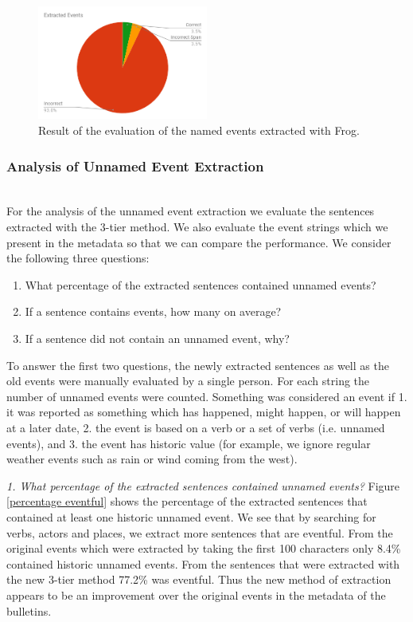 \documentclass[a4paper, 10pt, conference]{ieeeconf}      %
\begin{document}
\begin{figure}
  \centering
  \includegraphics[width= 0.5\textwidth]{FrogEvents2}
  \caption{Result of the evaluation of the named events extracted with Frog.}
  \label{Frog events}
\end{figure}

\subsubsection{Analysis of Unnamed Event Extraction}\label{Analysis2}~\\
For the analysis of the unnamed event extraction we evaluate the sentences extracted with the 3-tier method. We also evaluate the event strings which we present in the metadata so that we can compare the performance. We consider the following three questions:
\begin{enumerate}
\item What percentage of the extracted sentences contained unnamed events?
\item If a sentence contains events, how many on average?
\item If a sentence did not contain an unnamed event, why?
\end{enumerate}

To answer the first two questions, the newly extracted sentences as well as the old events were manually evaluated by a single person. For each string the number of unnamed events were counted. Something was considered an event if 1. it was reported as something which has happened, might happen, or will happen at a later date, 2. the event is based on a verb or a set of verbs (i.e. unnamed events), and 3. the event has historic value (for example, we ignore regular weather events such as rain or wind coming from the west).

\textit{1. What percentage of the extracted sentences contained unnamed events?} Figure \ref{percentage eventful} shows the percentage of the extracted sentences that contained at least one historic unnamed event. We see that by searching for verbs, actors and places, we extract more sentences that are eventful. From the original events which were extracted by taking the first 100 characters only 8.4\% contained historic unnamed events. From the sentences that were extracted with the new 3-tier method 77.2\% was eventful. Thus the new method of extraction appears to be an improvement over the original events in the metadata of the bulletins.
\end{document}
